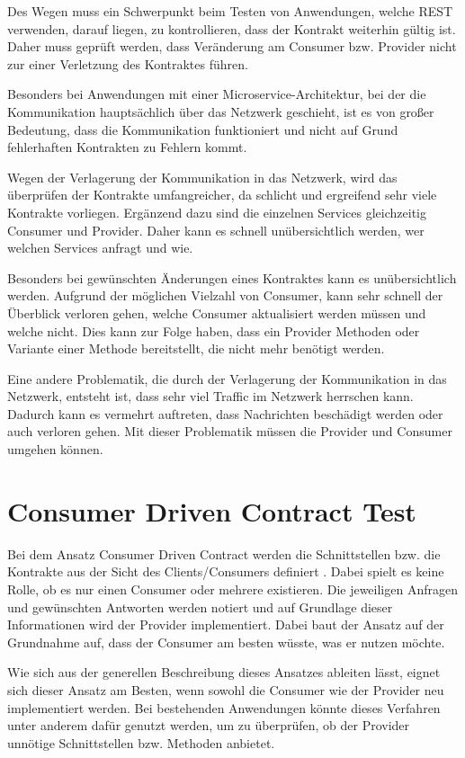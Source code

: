 \documentclass{llncs}
\begin{document}
Des Wegen muss ein Schwerpunkt beim Testen von Anwendungen, welche REST verwenden, darauf liegen, zu kontrollieren, dass der Kontrakt weiterhin gültig ist. Daher muss geprüft werden, dass Veränderung am Consumer bzw. Provider nicht zur einer Verletzung des Kontraktes führen.

Besonders bei Anwendungen mit einer Microservice-Architektur, bei der die Kommunikation hauptsächlich über das Netzwerk geschieht, ist es von großer Bedeutung, dass die Kommunikation funktioniert und nicht auf Grund fehlerhaften Kontrakten zu Fehlern kommt.

Wegen der Verlagerung der Kommunikation in das Netzwerk, wird das überprüfen der Kontrakte umfangreicher, da schlicht und ergreifend sehr viele Kontrakte vorliegen. Ergänzend dazu sind die einzelnen Services gleichzeitig Consumer und Provider. Daher kann es schnell unübersichtlich werden, wer welchen Services anfragt und wie.

Besonders bei gewünschten Änderungen eines Kontraktes kann es unübersichtlich werden. Aufgrund der möglichen Vielzahl von Consumer, kann  sehr schnell der Überblick verloren gehen, welche Consumer aktualisiert werden müssen und welche nicht. Dies kann zur Folge haben, dass ein Provider Methoden oder Variante einer Methode bereitstellt, die nicht mehr benötigt werden.

Eine andere Problematik, die durch der Verlagerung der Kommunikation in das Netzwerk, entsteht ist, dass sehr viel Traffic im Netzwerk herrschen kann. Dadurch kann es vermehrt auftreten, dass Nachrichten beschädigt werden oder auch verloren gehen. Mit dieser Problematik müssen die Provider und Consumer umgehen können.

\section{Consumer Driven Contract Test}
Bei dem Ansatz Consumer Driven Contract werden die Schnittstellen bzw. die Kontrakte aus der Sicht des Clients/Consumers definiert \cite{Robinson2006, bayer2015jaxcenter, vitz2016inno}. Dabei spielt es keine Rolle, ob es nur einen Consumer oder mehrere existieren. Die jeweiligen Anfragen und gewünschten Antworten werden notiert und auf Grundlage dieser Informationen wird der Provider implementiert. Dabei baut der Ansatz auf der Grundnahme auf, dass der Consumer am besten wüsste, was er nutzen möchte.

Wie sich aus der generellen Beschreibung dieses Ansatzes ableiten lässt, eignet sich dieser Ansatz am Besten, wenn sowohl die Consumer wie der Provider neu implementiert werden. Bei bestehenden Anwendungen könnte dieses Verfahren unter anderem dafür genutzt werden, um zu überprüfen, ob der Provider unnötige Schnittstellen bzw. Methoden anbietet.
\end{document}
